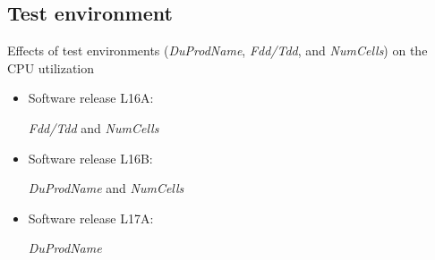 \documentclass{beamer}
\begin{document}
\subsection{Test environment}
\begin{frame}[fragile]
Effects of test environments (\textit{DuProdName}, \textit{Fdd/Tdd}, and \textit{NumCells}) on the CPU utilization

\begin{itemize}
	\item Software release L16A:
	
	\textit{Fdd/Tdd} and \textit{NumCells}
	
	\item Software release L16B:
	
	\textit{DuProdName} and \textit{NumCells}
	
	\item Software release L17A:
	
	\textit{DuProdName} 
	
\end{itemize}

\end{frame}
\end{document}
